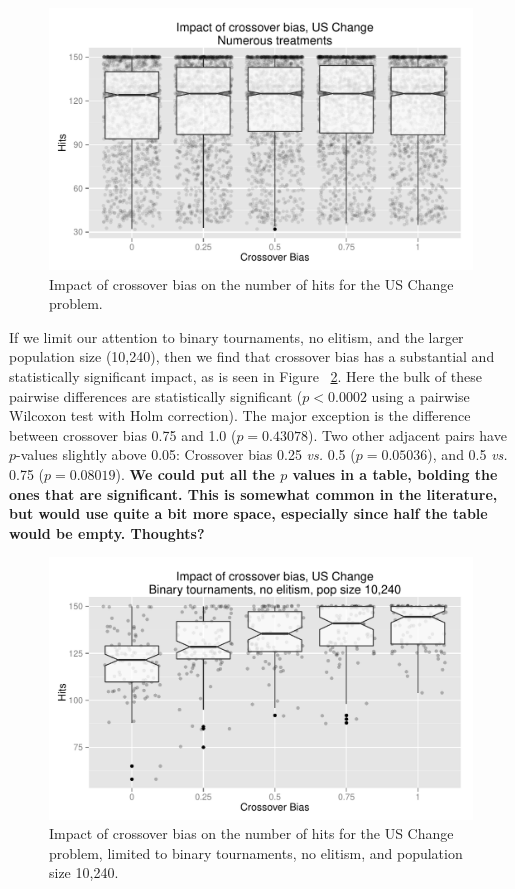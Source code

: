 \documentclass{sig-alternate}
\begin{document}
\begin{figure}
\centering
\includegraphics[width=0.45 \textwidth]{Plots/US_change_hits.pdf}
\caption{Impact of crossover bias on the number of hits for the US Change problem.}
\label{fig:USChange_Hits}
\end{figure}

%
%
%
%

If we limit our attention to binary tournaments, no elitism, and the larger population size (10,240), then we find that 
crossover bias has a substantial and statistically significant impact, as is seen in Figure~
\ref{fig:USChange_Hits_strong}. Here the bulk of these pairwise differences are statistically significant ($p<0.0002$ 
using a pairwise Wilcoxon test with Holm correction). The major exception is the difference between crossover bias 
0.75 and 1.0 ($p=0.43078$). Two other adjacent pairs have $p$-values slightly above 0.05: Crossover bias 0.25 
\emph{vs.} 0.5 ($p=0.05036$), and 0.5 \emph{vs.} 0.75 ($p=0.08019$). \textbf{We could put all the $p$ values in a 
table, bolding the ones that are significant. This is somewhat common in the literature, but would use quite a bit more 
space, especially since half the table would be empty. Thoughts?}

\begin{figure}
\centering
\includegraphics[width=0.45 \textwidth]{Plots/US_change_hits_strong.pdf}
\caption{Impact of crossover bias on the number of hits for the US Change problem, limited to binary 
tournaments, no elitism, and population size 10,240.}
\label{fig:USChange_Hits_strong}
\end{figure}
\end{document}
